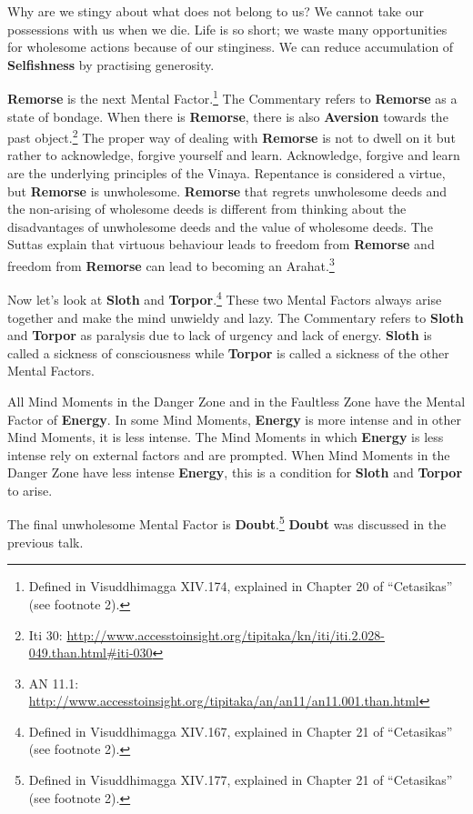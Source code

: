 Why are we stingy about what does not belong to us? We cannot take our possessions with us when we die. Life is so short; we waste many opportunities for wholesome actions because of our stinginess. We can reduce accumulation of \textbf{Selfishness} by practising generosity.

\textbf{Remorse} is the next Mental Factor.\footnote{Defined in Visuddhimagga XIV.174, explained in Chapter 20 of “Cetasikas” (see footnote 2).} The Commentary refers to \textbf{Remorse} as a state of bondage. When there is \textbf{Remorse}, there is also \textbf{Aversion} towards the past object.\footnote{Iti 30: \url{http://www.accesstoinsight.org/tipitaka/kn/iti/iti.2.028-049.than.html\#iti-030}} The proper way of dealing with \textbf{Remorse} is not to dwell on it but rather to acknowledge, forgive yourself and learn. Acknowledge, forgive and learn are the underlying principles of the Vinaya. Repentance is considered a virtue, but \textbf{Remorse} is unwholesome. \textbf{Remorse} that regrets unwholesome deeds and the non-arising of wholesome deeds is different from thinking about the disadvantages of unwholesome deeds and the value of wholesome deeds. The Suttas explain that virtuous behaviour leads to freedom from \textbf{Remorse} and freedom from \textbf{Remorse} can lead to becoming an Arahat.\footnote{AN 11.1: \url{http://www.accesstoinsight.org/tipitaka/an/an11/an11.001.than.html}}

Now let’s look at \textbf{Sloth} and \textbf{Torpor}.\footnote{Defined in Visuddhimagga XIV.167, explained in Chapter 21 of “Cetasikas” (see footnote 2).} These two Mental Factors always arise together and make the mind unwieldy and lazy. The Commentary refers to \textbf{Sloth} and \textbf{Torpor} as paralysis due to lack of urgency and lack of energy. \textbf{Sloth} is called a sickness of consciousness while \textbf{Torpor} is called a sickness of the other Mental Factors.

All Mind Moments in the Danger Zone and in the Faultless Zone have the Mental Factor of \textbf{Energy}. In some Mind Moments, \textbf{Energy} is more intense and in other Mind Moments, it is less intense. The Mind Moments in which \textbf{Energy} is less intense rely on external factors and are prompted. When Mind Moments in the Danger Zone have less intense \textbf{Energy}, this is a condition for \textbf{Sloth} and \textbf{Torpor} to arise.

The final unwholesome Mental Factor is \textbf{Doubt}.\footnote{Defined in Visuddhimagga XIV.177, explained in Chapter 21 of “Cetasikas” (see footnote 2).} \textbf{Doubt} was discussed in the previous talk.

